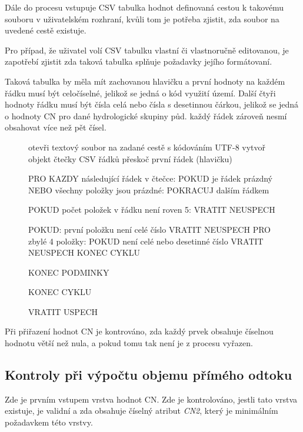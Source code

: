 \documentclass[a4paper,oneside,12pt]{book}
\begin{document}
\hspace{10mm} Dále do procesu vstupuje CSV tabulka hodnot definovaná cestou k takovému souboru v uživatelském rozhraní, kvůli tom je potřeba zjistit, zda soubor na uvedené cestě existuje.

\hspace{10mm} Pro případ, že uživatel volí CSV tabulku vlastní či vlastnoručně editovanou, je zapotřebí zjistit zda taková tabulka splňuje požadavky jejího formátovaní. 

\hspace{10mm} Taková tabulka by měla mít zachovanou hlavičku a první hodnoty na každém řádku musí být celočíselné, jelikož se jedná o kód využití území. Další čtyři hodnoty řádku musí být čísla celá nebo čísla s desetinnou čárkou, jelikož se jedná o hodnoty CN pro dané hydrologické skupiny půd. každý řádek zároveň nesmí obsahovat více než pět čísel.


\begin{figure}[H]
\begin{pseudocode}[style=mypseudocode, caption={Ukázka kontroly CSV souboru},label={kod:csv_check}]
otevři textový soubor na zadané cestě s kódováním UTF-8
vytvoř objekt čtečky CSV řádků
přeskoč první řádek (hlavičku)

PRO KAZDY následující řádek v čtečce:
    POKUD je řádek prázdný NEBO všechny položky jsou prázdné:
        POKRACUJ dalším řádkem
    
    POKUD počet položek v řádku není roven 5:
        VRATIT NEUSPECH
    

    POKUD:
        první položku není celé číslo
        VRATIT NEUSPECH
        PRO zbylé 4 položky:
            POKUD není celé nebo desetinné číslo
            VRATIT NEUSPECH
            KONEC CYKLU

    KONEC PODMINKY
    
KONEC CYKLU

VRATIT USPECH
\end{pseudocode}
\end{figure}

\hspace{10mm} Při přiřazení hodnot CN je kontrováno, zda každý prvek obsahuje číselnou hodnotu větší než nula, a pokud tomu tak není je z procesu vyřazen.

\subsection{Kontroly při výpočtu objemu přímého odtoku} 
\label{runoff_checks}
\hspace{10mm} Zde je prvním vstupem vrstva hodnot CN. Zde je kontrolováno, jestli tato vrstva existuje, je validní a zda obsahuje číselný atribut \textit{CN2}, který je minimálním požadavkem této vrstvy.
\end{document}
